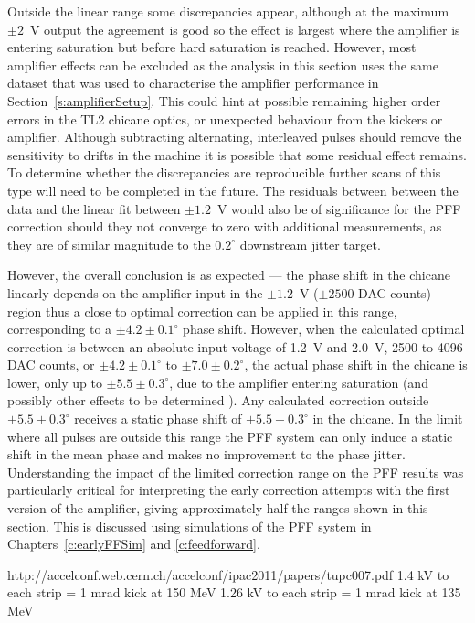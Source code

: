 Outside the linear range some discrepancies appear, although at the maximum \(\pm2\)~V output the agreement is good so the effect is largest where the amplifier is entering saturation but before hard saturation is reached. However, most amplifier effects can be excluded as the analysis in this section uses the same dataset that was used to characterise the amplifier performance in Section~\ref{s:amplifierSetup}. This could hint at possible remaining higher order errors in the TL2 chicane optics, or unexpected behaviour from the kickers or amplifier. Although subtracting alternating, interleaved pulses should remove the sensitivity to drifts in the machine it is possible that some residual effect remains. To determine whether the discrepancies are reproducible further scans of this type will need to be completed in the future. The residuals between between the data and the linear fit between \(\pm1.2\)~V would also be of significance for the PFF correction should they not converge to zero with additional measurements, as they are of similar magnitude to the \(0.2^\circ\) downstream jitter target. 

However, the overall conclusion is as expected --- the phase shift in the chicane linearly depends on the amplifier input in the \(\pm1.2\)~V (\(\pm2500\) DAC counts) region thus a close to optimal correction can be applied in this range, corresponding to a \(\pm4.2\pm0.1^\circ\) phase shift. However, when the calculated optimal correction is between an absolute input voltage of 1.2~V and 2.0~V, 2500 to 4096 DAC counts, or \(\pm4.2\pm0.1^\circ\) to \(\pm7.0\pm0.2^\circ\), the actual phase shift in the chicane is lower, only up to \(\pm5.5\pm0.3^\circ\), due to the amplifier entering saturation (and possibly other effects to be determined ). Any calculated correction outside \(\pm5.5\pm0.3^\circ\) receives a static phase shift of \(\pm5.5\pm0.3^\circ\) in the chicane. In the limit where all pulses are outside this range the PFF system can only induce a static shift in the mean phase and makes no improvement to the phase jitter. Understanding the impact of the limited correction range on the PFF results was particularly critical for interpreting the early correction attempts with the first version of the amplifier, giving approximately half the ranges shown in this section. This is discussed using simulations of the PFF system in Chapters~\ref{c:earlyFFSim} and \ref{c:feedforward}.

http://accelconf.web.cern.ch/accelconf/ipac2011/papers/tupc007.pdf
1.4 kV to each strip = 1 mrad kick at 150 MeV
1.26 kV to each strip = 1 mrad kick at 135 MeV

